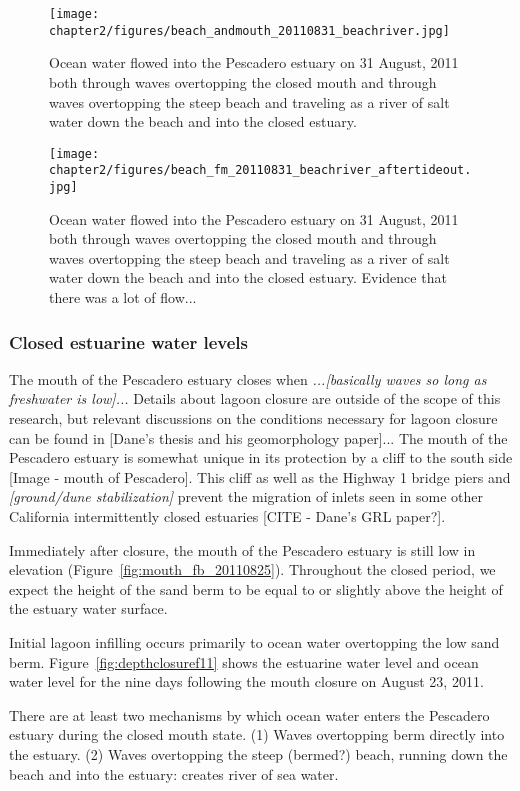 \begin{figure}
\texttt{[image: chapter2/figures/beach\_andmouth\_20110831\_beachriver.jpg]} \caption{Ocean water flowed into the Pescadero estuary on 31 August, 2011 both through waves overtopping the closed mouth and through waves overtopping the steep beach and traveling as a river of salt water down the beach and into the closed estuary.}
\label{fig:beachriver} \end{figure}

\begin{figure}
\texttt{[image: chapter2/figures/beach\_fm\_20110831\_beachriver\_aftertideout.jpg]} \caption{Ocean water flowed into the Pescadero estuary on 31 August, 2011 both through waves overtopping the closed mouth and through waves overtopping the steep beach and traveling as a river of salt water down the beach and into the closed estuary. Evidence that there was a lot of flow...}
\label{fig:beachriver_after} \end{figure}

\subsubsection{Closed estuarine water levels} \label{cl_wl}
The mouth of the Pescadero estuary closes when \emph{...[basically waves
so long as freshwater is low]...} Details about lagoon closure are
outside of the scope of this research, but relevant discussions on the
conditions necessary for lagoon closure can be found in [Dane's thesis
and his geomorphology paper]... The mouth of the Pescadero estuary is
somewhat unique in its protection by a cliff to the south side [Image -
mouth of Pescadero]. This cliff as well as the Highway 1 bridge piers
and \emph{[ground/dune stabilization]} prevent the migration of inlets
seen in some other California intermittently closed estuaries [CITE -
Dane's GRL paper?].

Immediately after closure, the mouth of the Pescadero estuary is still
low in elevation (Figure~\ref{fig:mouth_fb_20110825}). Throughout the closed period, we
expect the height of the sand berm to be equal to or slightly above the
height of the estuary water surface.

Initial lagoon infilling occurs primarily to ocean water overtopping the
low sand berm. Figure~\ref{fig:depthclosuref11} shows the estuarine water level and ocean
water level for the nine days following the mouth closure on August 23, 2011. 

There are at least two mechanisms by which ocean water enters the
Pescadero estuary during the closed mouth state. (1) Waves overtopping
berm directly into the estuary. (2) Waves overtopping the steep
(bermed?) beach, running down the beach and into the estuary: creates
river of sea water.

